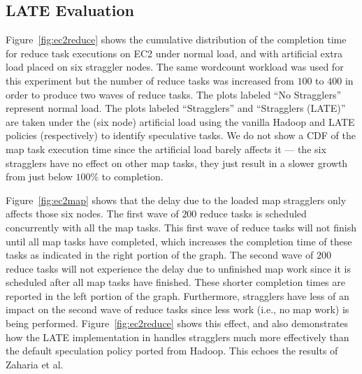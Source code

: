 

\subsection{LATE Evaluation}
Figure~\ref{fig:ec2reduce} shows the cumulative distribution of the
completion time for reduce task executions on EC2 under normal load,
and with artificial extra load placed on six straggler nodes.  The
same wordcount workload was used for this experiment but the number of
reduce tasks was increased from $100$ to $400$ in order to produce two
waves of reduce tasks.  The plots labeled ``No Stragglers'' represent
normal load.  The plots labeled ``Stragglers'' and ``Stragglers
(LATE)'' are taken under the (six node) artificial load using the
vanilla Hadoop and LATE policies (respectively) to identify
speculative tasks.  We do not show a CDF of the map task execution
time since the artificial load barely affects it --- the six
stragglers have no effect on other map tasks, they just result in a
slower growth from just below $100\%$ to completion.

Figure~\ref{fig:ec2map} shows that the delay due to the loaded map stragglers only
affects those six nodes.  
The first wave of $200$ reduce tasks is scheduled concurrently with
all the map tasks. This first wave of reduce tasks will not finish
until all map tasks have completed, which increases the completion time
of these tasks as indicated in the right portion of the graph. The
second wave of $200$ reduce tasks will not experience the delay due to
unfinished map work since it is scheduled after all map tasks have
finished. These shorter completion times are reported in the left
portion of the graph. Furthermore, stragglers have less of an impact
on the second wave of reduce tasks since less work (i.e., no map work)
is being performed. Figure~\ref{fig:ec2reduce} shows this effect, and
also demonstrates how the LATE implementation in \BOOMA handles
stragglers much more effectively than the default speculation policy
ported from Hadoop.  This echoes the results of Zaharia et al.~\cite{late-sched}

